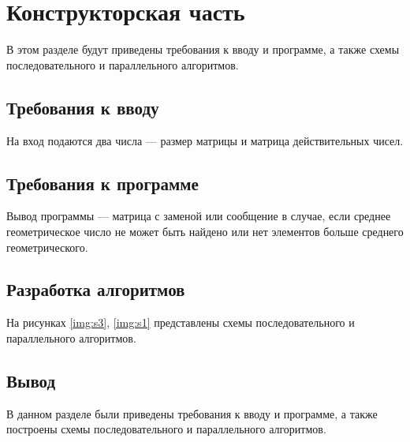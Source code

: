 \chapter{Конструкторская часть}
В этом разделе будут приведены требования к вводу и программе, а также схемы последовательного и параллельного алгоритмов.

\section{Требования к вводу}
На вход подаются два числа --- размер матрицы и матрица действительных чисел.

\section{Требования к программе}

Вывод программы --- матрица с заменой или сообщение в случае, если среднее геометрическое число не может быть найдено или нет элементов больше среднего геометрического.

\section{Разработка алгоритмов}

На рисунках \ref{img:s3}, \ref{img:s1} представлены схемы последовательного и параллельного алгоритмов.

\newpage
{}

\newpage
{}

\newpage
\section*{Вывод}
В данном разделе были приведены требования к вводу и программе, а также построены схемы последовательного и параллельного алгоритмов.